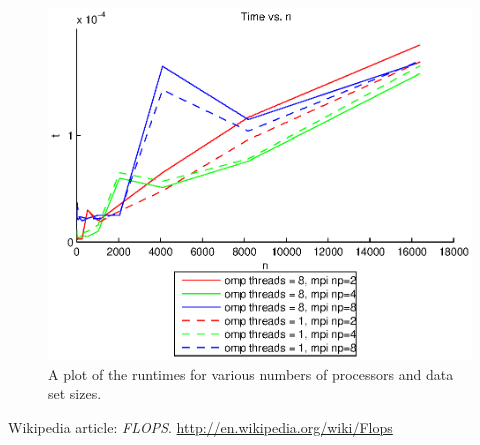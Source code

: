 

\begin{figure}[htbp]
  \centering
  \includegraphics[]{graphics/runtime.eps}
  \caption{A plot of the runtimes for various numbers of processors and data set sizes.}
  \label{fig:runtime}
\end{figure}


\begin{thebibliography}{1}
   Wikipedia article: \emph{FLOPS}. \url{http://en.wikipedia.org/wiki/Flops}
\end{thebibliography}



